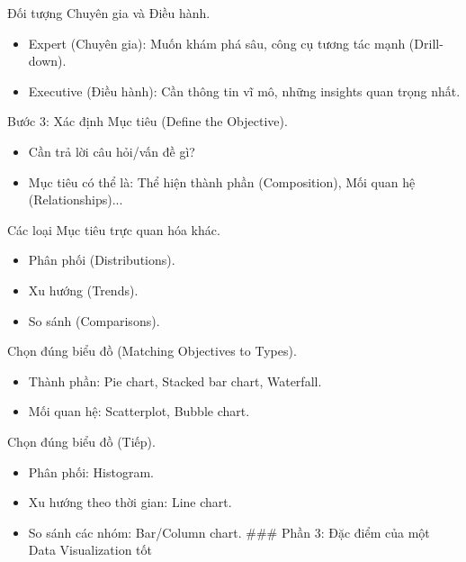 \documentclass[aspectratio=169]{beamer}
\begin{document}
\begin{frame}{Đối tượng Chuyên gia và Điều hành.}
    \begin{itemize}
        \item Expert (Chuyên gia): Muốn khám phá sâu, công cụ tương tác mạnh (Drill-down).
        \item Executive (Điều hành): Cần thông tin vĩ mô, những insights quan trọng nhất.
    \end{itemize}
\end{frame}


\begin{frame}{Bước 3: Xác định Mục tiêu (Define the Objective).}
    \begin{itemize}
        \item Cần trả lời câu hỏi/vấn đề gì?
        \item Mục tiêu có thể là: Thể hiện thành phần (Composition), Mối quan hệ (Relationships)...
    \end{itemize}
\end{frame}


\begin{frame}{Các loại Mục tiêu trực quan hóa khác.}
    \begin{itemize}
        \item Phân phối (Distributions).
        \item Xu hướng (Trends).
        \item So sánh (Comparisons).
    \end{itemize}
\end{frame}


\begin{frame}{Chọn đúng biểu đồ (Matching Objectives to Types).}
    \begin{itemize}
        \item Thành phần: Pie chart, Stacked bar chart, Waterfall.
        \item Mối quan hệ: Scatterplot, Bubble chart.
    \end{itemize}
\end{frame}


\begin{frame}{Chọn đúng biểu đồ (Tiếp).}
    \begin{itemize}
        \item Phân phối: Histogram.
        \item Xu hướng theo thời gian: Line chart.
        \item So sánh các nhóm: Bar/Column chart.
        ### Phần 3: Đặc điểm của một Data Visualization tốt
    \end{itemize}
\end{frame}
\end{document}
